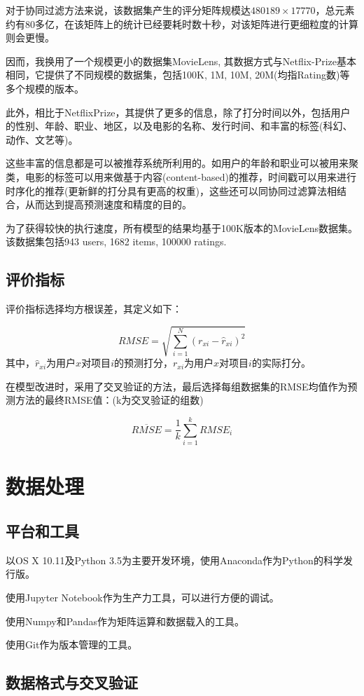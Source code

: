 \documentclass[utf8, a4paper,12pt, onecolumn]{ctexart}
\begin{document}
\begin{spacing}{1.3}
对于协同过滤方法来说，该数据集产生的评分矩阵规模达$480189 \times 17770$，总元素约有80多亿，在该矩阵上的统计已经要耗时数十秒，对该矩阵进行更细粒度的计算则会更慢。

因而，我换用了一个规模更小的数据集MovieLens, 其数据方式与Netflix-Prize基本相同，它提供了不同规模的数据集，包括100K, 1M, 10M, 20M(均指Rating数)等多个规模的版本。

此外，相比于NetflixPrize，其提供了更多的信息，除了打分时间以外，包括用户的性别、年龄、职业、地区，以及电影的名称、发行时间、和丰富的标签(科幻、动作、文艺等)。

这些丰富的信息都是可以被推荐系统所利用的。如用户的年龄和职业可以被用来聚类，电影的标签可以用来做基于内容(content-based)的推荐，时间戳可以用来进行时序化的推荐(更新鲜的打分具有更高的权重)，这些还可以同协同过滤算法相结合，从而达到提高预测速度和精度的目的。

为了获得较快的执行速度，所有模型的结果均基于100K版本的MovieLens数据集。该数据集包括943 users, 1682 items, 100000 ratings.

\subsection{评价指标}
\label{评价指标}
评价指标选择均方根误差，其定义如下：

\[RMSE = \sqrt{\sum_{i = 1}^{N}(r_{xi} - \hat{r}_{xi})^{2}}\]
其中，$\hat{r}_{xi}$为用户$x$对项目$i$的预测打分，$r_{xi}$为用户$x$对项目$i$的实际打分。

在模型改进时，采用了交叉验证的方法，最后选择每组数据集的RMSE均值作为预测方法的最终RMSE值：(k为交叉验证的组数)

\[\overline{RMSE} = \frac{1}{k}\sum_{i=1}^{k}RMSE_{i}\]

\section{数据处理}

\subsection{平台和工具}

以OS X 10.11及Python 3.5为主要开发环境，使用Anaconda作为Python的科学发行版。

使用Jupyter Notebook作为生产力工具，可以进行方便的调试。

使用Numpy和Pandas作为矩阵运算和数据载入的工具。

使用Git作为版本管理的工具。

\subsection{数据格式与交叉验证}


\end{spacing}
\end{document}
